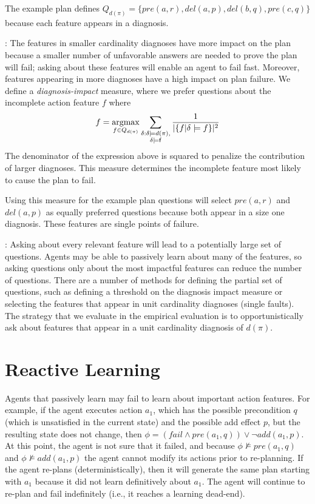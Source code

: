 \documentclass[letterpaper]{article}
\def\und#1{\noindent{\bf #1}:}
\begin{document}
The example plan defines $Q_{d(\pi)} = \{pre(a, r), del(a, p), del(b, q),
pre(c, q) \}$ because each feature appears in a diagnosis.

\und{Ranking Relevant Questions}  
The features in smaller cardinality diagnoses have more impact on the plan
because a smaller number of unfavorable answers are needed to prove the plan
will fail; asking about these features will enable an agent to fail fast. 
Moreover, features appearing in more diagnoses have a high impact on plan
failure.  We define a {\em diagnosis-impact}  measure, where we prefer questions
about the incomplete action feature $f$ where
\begin{align}
f = \underset{f  \in Q_{d(\pi)}}{\operatorname{argmax}}
\sum\limits_{\substack{\delta : \delta \models d(\pi),\\ \delta\models {\sf
f}}}
\frac{1}{|\{{f}| \delta \models { f}\}|^2}
\notag 
\end{align}
The denominator of the expression above is squared to penalize the contribution
of larger diagnoses.  This measure determines the incomplete feature most
likely to cause the plan to fail.

Using this measure for the example plan questions will select $pre(a, r)$ and
$del(a, p)$ as equally preferred questions because both appear in a size one
diagnosis.  These features are single points of failure.


\und{Partial Proactivity} Asking about every relevant feature will lead to a
potentially large set of questions.  Agents may be able to passively learn
about many of the features, so asking questions only about the most impactful
features can reduce the number of questions.  There are a number of methods for
defining the partial set of questions, such as defining a threshold on the
diagnosis impact measure or selecting the features that appear in unit
cardinality diagnoses (single faults).  The strategy that we evaluate in the
empirical evaluation is to opportunistically ask about features that appear in a
unit cardinality diagnosis of $d(\pi)$.


\section{Reactive Learning}

Agents that passively learn may fail to learn about important action features. 
For example, if the agent executes action $a_1$, which has the possible
precondition $q$ (which is unsatisfied in the current state) and the possible
add effect $p$, but the resulting state does not change, then $\phi = (fail \wedge pre(a_1, q)) \vee
\neg add(a_1, p)$.  At this point, the agent is not sure that it failed, and
because $\phi \not\models  pre(a_1, q)$ and $\phi \not\models add(a_1, p)$ the
agent cannot modify its actions prior to re-planning. If the agent re-plans
(deterministically), then it will generate the same plan starting with $a_1$
because it did not learn definitively about $a_1$.  The agent will continue to
re-plan and fail indefinitely (i.e., it reaches a learning dead-end).
\end{document}
